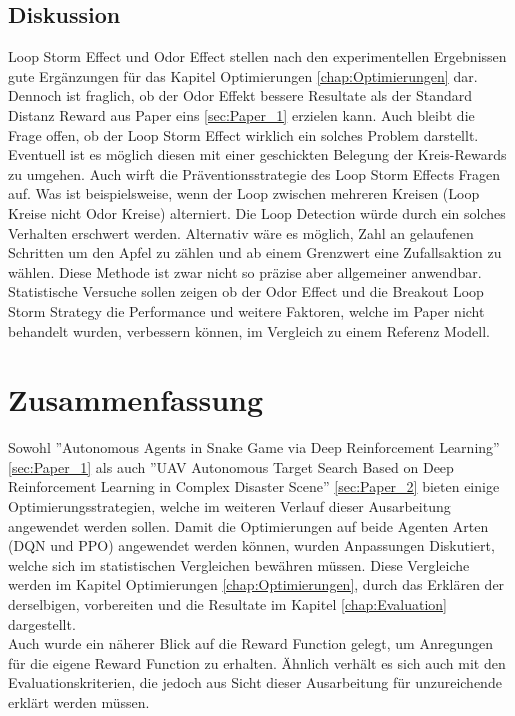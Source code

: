 \subsection{Diskussion}\label{sec:Paper_2_Diskussion}
Loop Storm Effect und Odor Effect stellen nach den experimentellen Ergebnissen gute Ergänzungen für das Kapitel Optimierungen \ref{chap:Optimierungen} dar. Dennoch ist fraglich, ob der Odor Effekt bessere Resultate als der Standard Distanz Reward aus Paper eins \ref{sec:Paper_1} erzielen kann. Auch bleibt die Frage offen, ob der Loop Storm Effect wirklich ein solches Problem darstellt. Eventuell ist es möglich diesen mit einer geschickten Belegung der Kreis-Rewards zu umgehen. Auch wirft die Präventionsstrategie des Loop Storm Effects Fragen auf. Was ist beispielsweise, wenn der Loop zwischen mehreren Kreisen (Loop Kreise nicht Odor Kreise) alterniert. Die Loop Detection würde durch ein solches Verhalten erschwert werden. Alternativ wäre es möglich, Zahl an gelaufenen Schritten um den Apfel zu zählen und ab einem Grenzwert eine Zufallsaktion zu wählen. Diese Methode ist zwar nicht so präzise aber allgemeiner anwendbar. Statistische Versuche sollen zeigen ob der Odor Effect und die Breakout Loop Storm Strategy die Performance und weitere Faktoren, welche im Paper nicht behandelt wurden, verbessern können, im Vergleich zu einem Referenz Modell.

\section{Zusammenfassung}
Sowohl ''Autonomous Agents in Snake Game via Deep Reinforcement Learning'' \ref{sec:Paper_1} als auch ''UAV Autonomous Target Search Based on Deep Reinforcement Learning in Complex Disaster Scene'' \ref{sec:Paper_2} bieten einige Optimierungsstrategien, welche im weiteren Verlauf dieser Ausarbeitung angewendet werden sollen. Damit die Optimierungen auf beide Agenten Arten (DQN und PPO) angewendet werden können, wurden Anpassungen Diskutiert, welche sich im statistischen Vergleichen bewähren müssen. Diese Vergleiche werden im Kapitel Optimierungen \ref{chap:Optimierungen}, durch das Erklären der derselbigen, vorbereiten und die Resultate im Kapitel \ref{chap:Evaluation} dargestellt.\\
Auch wurde ein näherer Blick auf die Reward Function gelegt, um Anregungen für die eigene Reward Function zu erhalten. Ähnlich verhält es sich auch mit den Evaluationskriterien, die jedoch aus Sicht dieser Ausarbeitung für unzureichende erklärt werden müssen.
